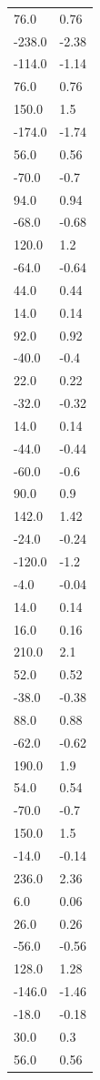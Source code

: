 \begin{longtable}{ll}
76.0 & 0.76 \\
-238.0 & -2.38 \\
-114.0 & -1.14 \\
76.0 & 0.76 \\
150.0 & 1.5 \\
-174.0 & -1.74 \\
56.0 & 0.56 \\
-70.0 & -0.7 \\
94.0 & 0.94 \\
-68.0 & -0.68 \\
120.0 & 1.2 \\
-64.0 & -0.64 \\
44.0 & 0.44 \\
14.0 & 0.14 \\
92.0 & 0.92 \\
-40.0 & -0.4 \\
22.0 & 0.22 \\
-32.0 & -0.32 \\
14.0 & 0.14 \\
-44.0 & -0.44 \\
-60.0 & -0.6 \\
90.0 & 0.9 \\
142.0 & 1.42 \\
-24.0 & -0.24 \\
-120.0 & -1.2 \\
-4.0 & -0.04 \\
14.0 & 0.14 \\
16.0 & 0.16 \\
210.0 & 2.1 \\
52.0 & 0.52 \\
-38.0 & -0.38 \\
88.0 & 0.88 \\
-62.0 & -0.62 \\
190.0 & 1.9 \\
54.0 & 0.54 \\
-70.0 & -0.7 \\
150.0 & 1.5 \\
-14.0 & -0.14 \\
236.0 & 2.36 \\
6.0 & 0.06 \\
26.0 & 0.26 \\
-56.0 & -0.56 \\
128.0 & 1.28 \\
-146.0 & -1.46 \\
-18.0 & -0.18 \\
30.0 & 0.3 \\
56.0 & 0.56 \\

\end{longtable}
